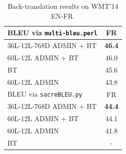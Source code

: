 \begin{table}[ht]
    \centering
    \begin{tabular}{|l|c|}
    \hline
        BLEU via \texttt{multi-bleu.perl} & FR  \\\hline
        36L-12L-768D ADMIN + BT & {\bf 46.4}  \\
        60L-12L ADMIN + BT & 46.0  \\
       BT \cite{edunov2018back-nmt} & 45.6 \\
        60L-12L ADMIN & 43.8  \\ 
        \hline\hline
        BLEU via \texttt{sacreBLEU.py} & FR \\\hline
        36L-12L-768D ADMIN + BT & {\bf 44.4}  \\
        60L-12L ADMIN + BT & 44.1  \\
        60L-12L ADMIN & 41.8  \\
        BT \cite{edunov2018back-nmt} & - \\
        \hline
    \end{tabular}
    \caption{Back-translation results on WMT'14 EN-FR.}
    \label{tab:admin-bt}
\vspace{-4mm}    
\end{table}